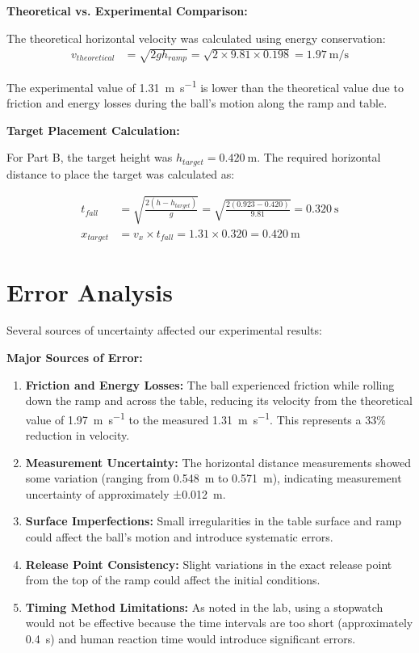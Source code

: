 \documentclass[12pt]{article}
\begin{document}
\textbf{Theoretical vs. Experimental Comparison:}

The theoretical horizontal velocity was calculated using energy conservation:
\begin{align}
v_{theoretical} &= \sqrt{2gh_{ramp}} = \sqrt{2 \times 9.81 \times 0.198} = \SI{1.97}{\meter\per\second}
\end{align}

The experimental value of \SI{1.31}{\meter\per\second} is lower than the theoretical value due to friction and energy losses during the ball's motion along the ramp and table.

\textbf{Target Placement Calculation:}

For Part B, the target height was $h_{target} = \SI{0.420}{\meter}$. The required horizontal distance to place the target was calculated as:

\begin{align}
t_{fall} &= \sqrt{\frac{2(h - h_{target})}{g}} = \sqrt{\frac{2(0.923 - 0.420)}{9.81}} = \SI{0.320}{\second} \\
x_{target} &= v_x \times t_{fall} = 1.31 \times 0.320 = \SI{0.420}{\meter}
\end{align}

\section{Error Analysis}

Several sources of uncertainty affected our experimental results:

\textbf{Major Sources of Error:}
\begin{enumerate}
    \item \textbf{Friction and Energy Losses:} The ball experienced friction while rolling down the ramp and across the table, reducing its velocity from the theoretical value of \SI{1.97}{\meter\per\second} to the measured \SI{1.31}{\meter\per\second}. This represents a 33\% reduction in velocity.
    
    \item \textbf{Measurement Uncertainty:} The horizontal distance measurements showed some variation (ranging from \SI{0.548}{\meter} to \SI{0.571}{\meter}), indicating measurement uncertainty of approximately ±\SI{0.012}{\meter}.
    
    \item \textbf{Surface Imperfections:} Small irregularities in the table surface and ramp could affect the ball's motion and introduce systematic errors.
    
    \item \textbf{Release Point Consistency:} Slight variations in the exact release point from the top of the ramp could affect the initial conditions.
    
    \item \textbf{Timing Method Limitations:} As noted in the lab, using a stopwatch would not be effective because the time intervals are too short (approximately \SI{0.4}{\second}) and human reaction time would introduce significant errors.
\end{enumerate}
\end{document}
